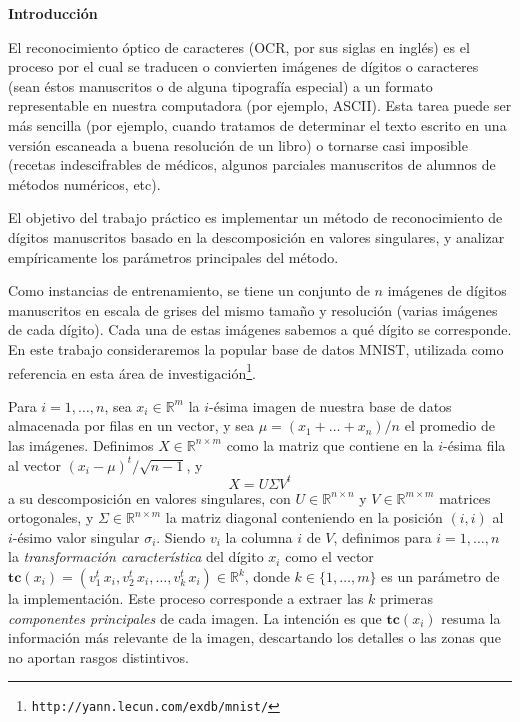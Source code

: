 \newcommand{\real}{\mathbb{R}}

{\bf Introducci\'on}

El reconocimiento \'optico de caracteres (OCR, por sus siglas en ingl\'es) es el proceso por el cual se traducen o convierten im\'agenes de d\'igitos o caracteres (sean \'estos manuscritos o de alguna tipograf\'ia especial) a un formato representable en nuestra computadora (por ejemplo, ASCII). Esta tarea puede ser m\'as sencilla (por ejemplo, cuando tratamos de determinar el texto escrito en una versi\'on escaneada a buena resoluci\'on de un libro) o tornarse casi imposible (recetas indescifrables de m\'edicos, algunos parciales manuscritos de alumnos de m\'etodos num\'ericos, etc).

El objetivo del trabajo pr\'actico es implementar un m\'etodo de reconocimiento de d\'igitos manuscritos basado en la descomposici\'on en valores singulares, y analizar emp\'iricamente los par\'ametros principales del m\'etodo.

Como instancias de entrenamiento, se tiene un conjunto de $n$ im\'agenes de d\'igitos ma\-nus\-cri\-tos en escala de grises del mismo tama\~no y resoluci\'on (varias im\'agenes de cada d\'igito). Cada una de estas im\'agenes sabemos a qu\'e d\'igito se corresponde.
En este trabajo consideraremos la popular base de datos MNIST, utilizada como referencia en esta \'area de investigaci\'on\footnote{\texttt{http://yann.lecun.com/exdb/mnist/}}. 

Para $i = 1,\ldots, n$, sea $x_i \in \real^{m}$ la $i$-\'esima imagen de nuestra base de datos almacenada por filas en un vector, y sea $\mu = (x_1 + \ldots + x_n)/n$ el promedio de las im\'agenes. Definimos $X\in\real^{n\times m}$ como la matriz que contiene en la $i$-\'esima fila al vector $(x_i - \mu)^{t}/\sqrt{n-1}$, y $$X=U \Sigma V^t$$ a su descomposici\'on en valores singulares, con $U\in\real^{n\times n}$ y $V\in\real^{m\times m}$ matrices ortogonales, y $\Sigma\in\real^{n\times m}$ la matriz diagonal conteniendo en la posici\'on $(i,i)$ al $i$-\'esimo valor singular $\sigma_i$.
Siendo $v_i$ la columna $i$ de $V$, definimos para $i = 1,\ldots,n$ la \textsl{transformaci\'on caracter\'istica} del d\'igito $x_{i}$ como el vector $\mathbf{tc}(x_i) = (v_1^t\, x_i, v_2^t\, x_i,\ldots,v_k^t\, x_i) \in\real^k$, donde $k \in\{1,\ldots,m\}$ es un par\'ametro de la implementaci\'on. Este proceso corresponde a extraer las $k$ primeras \textit{componentes principales} de cada imagen. La intenci\'on es que $\mathbf{tc}(x_i)$ resuma la informaci\'on m\'as relevante de la imagen, descartando los detalles o las zonas que no aportan rasgos distintivos.

